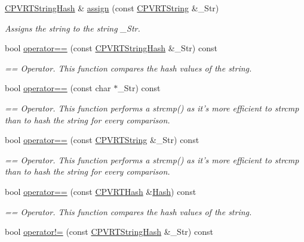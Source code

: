 \begin{DoxyCompactItemize}
\hyperlink{class_c_p_v_r_t_string_hash}{C\+P\+V\+R\+T\+String\+Hash} \& \hyperlink{class_c_p_v_r_t_string_hash_a54bc0c8774ff760defa02d419d812882}{assign} (const \hyperlink{class_c_p_v_r_t_string}{C\+P\+V\+R\+T\+String} \&\+\_\+\+Str)
\begin{DoxyCompactList}\small\item\em Assigns the string to the string \+\_\+\+Str. \end{DoxyCompactList}\item 
bool \hyperlink{class_c_p_v_r_t_string_hash_a7ca3e4cf21386717678c78143271d09d}{operator==} (const \hyperlink{class_c_p_v_r_t_string_hash}{C\+P\+V\+R\+T\+String\+Hash} \&\+\_\+\+Str) const 
\begin{DoxyCompactList}\small\item\em == Operator. This function compares the hash values of the string. \end{DoxyCompactList}\item 
bool \hyperlink{class_c_p_v_r_t_string_hash_a414ff5982348255fd517c5e930368695}{operator==} (const char $\ast$\+\_\+\+Str) const 
\begin{DoxyCompactList}\small\item\em == Operator. This function performs a strcmp() as it's more efficient to strcmp than to hash the string for every comparison. \end{DoxyCompactList}\item 
bool \hyperlink{class_c_p_v_r_t_string_hash_a85475a3b3eef4ce4362b2e25366cd2b1}{operator==} (const \hyperlink{class_c_p_v_r_t_string}{C\+P\+V\+R\+T\+String} \&\+\_\+\+Str) const 
\begin{DoxyCompactList}\small\item\em == Operator. This function performs a strcmp() as it's more efficient to strcmp than to hash the string for every comparison. \end{DoxyCompactList}\item 
bool \hyperlink{class_c_p_v_r_t_string_hash_a6d479aed313a30a202b0099dc78743c4}{operator==} (const \hyperlink{class_c_p_v_r_t_hash}{C\+P\+V\+R\+T\+Hash} \&\hyperlink{struct_hash}{Hash}) const 
\begin{DoxyCompactList}\small\item\em == Operator. This function compares the hash values of the string. \end{DoxyCompactList}\item 
bool \hyperlink{class_c_p_v_r_t_string_hash_a0c95ceb3cf42ce0cb4e521b3e8804e66}{operator!=} (const \hyperlink{class_c_p_v_r_t_string_hash}{C\+P\+V\+R\+T\+String\+Hash} \&\+\_\+\+Str) const 

\end{DoxyCompactItemize}
